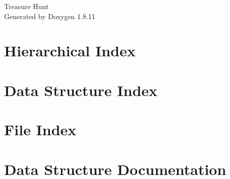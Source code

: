 \documentclass[twoside]{book}
\newcommand{\+}{\discretionary{\mbox{\scriptsize$\hookleftarrow$}}{}{}}
\newcommand{\clearemptydoublepage}{%
  \newpage{\pagestyle{empty}\cleardoublepage}%
}
\begin{document}
\hypersetup{pageanchor=false,
             bookmarksnumbered=true,
             pdfencoding=unicode
            }
\begin{titlepage}
\vspace*{7cm}
\begin{center}%
{\Large Treasure Hunt }\\
\vspace*{1cm}
{\large Generated by Doxygen 1.8.11}\\
\end{center}
\end{titlepage}
\clearemptydoublepage
\tableofcontents
\clearemptydoublepage
{}
\hypersetup{pageanchor=true}

\chapter{Hierarchical Index}

\chapter{Data Structure Index}

\chapter{File Index}

\chapter{Data Structure Documentation}















































\end{document}
